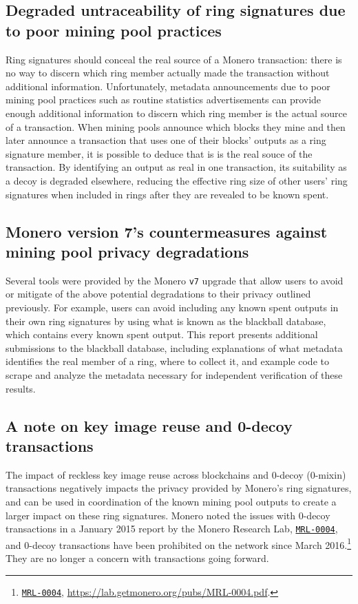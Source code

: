 \documentclass[notitlepage]{report}
\begin{document}
\subsection{Degraded untraceability of ring signatures due to poor mining pool practices}

Ring signatures should conceal the real source of a Monero transaction: there is no way to discern which ring member actually made the transaction without additional information.  Unfortunately, metadata announcements due to poor mining pool practices such as routine statistics advertisements can provide enough additional information to discern which ring member is the actual source of a transaction.  When mining pools announce which blocks they mine and then later announce a transaction that uses one of their blocks' outputs as a ring signature member, it is possible to deduce that is is the real souce of the transaction.  By identifying an output as real in one transaction, its suitability as a decoy is degraded elsewhere, reducing the effective ring size of other users' ring signatures when included in rings after they are revealed to be known spent.

\subsection{Monero version 7's countermeasures against mining pool privacy degradations}

Several tools were provided by the Monero \texttt{v7} upgrade that allow users to avoid or mitigate of the above potential degradations to their privacy outlined previously.  For example, users can avoid including any known spent outputs in their own ring signatures by using what is known as the blackball database, which contains every known spent output.  This report presents additional submissions to the blackball database, including explanations of what metadata identifies the real member of a ring, where to collect it, and example code to scrape and analyze the metadata necessary for independent verification of these results.

\subsection{A note on key image reuse and 0-decoy transactions}

The impact of reckless key image reuse across blockchains and 0-decoy (0-mixin) transactions negatively impacts the privacy provided by Monero's ring signatures, and can be used in coordination of the known mining pool outputs to create a larger impact on these ring signatures. Monero noted the issues with 0-decoy transactions in a January 2015 report by the Monero Research Lab, \href{https://lab.getmonero.org/pubs/MRL-0004.pdf}{\texttt{MRL-0004}}, and 0-decoy transactions have been prohibited on the network since March 2016.\footnote{\href{https://lab.getmonero.org/pubs/MRL-0004.pdf}{\texttt{MRL-0004}}, \url{https://lab.getmonero.org/pubs/MRL-0004.pdf}.}  They are no longer a concern with transactions going forward.
\end{document}
